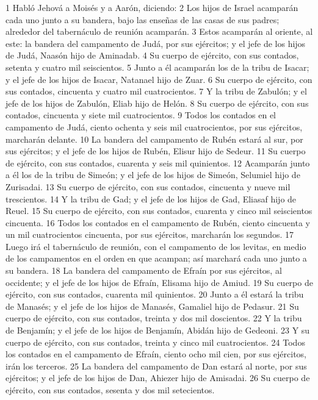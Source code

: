 1 Habló Jehová a Moisés y a Aarón, diciendo:
2 Los hijos de Israel acamparán cada uno junto a su bandera, bajo las enseñas de las casas de sus padres; alrededor del tabernáculo de reunión acamparán.
3 Estos acamparán al oriente, al este: la bandera del campamento de Judá, por sus ejércitos; y el jefe de los hijos de Judá, Naasón hijo de Aminadab.
4 Su cuerpo de ejército, con sus contados, setenta y cuatro mil seiscientos.
5 Junto a él acamparán los de la tribu de Isacar; y el jefe de los hijos de Isacar, Natanael hijo de Zuar.
6 Su cuerpo de ejército, con sus contados, cincuenta y cuatro mil cuatrocientos.
7 Y la tribu de Zabulón; y el jefe de los hijos de Zabulón, Eliab hijo de Helón. 
8 Su cuerpo de ejército, con sus contados, cincuenta y siete mil cuatrocientos.
9 Todos los contados en el campamento de Judá, ciento ochenta y seis mil cuatrocientos, por sus ejércitos, marcharán delante.
10 La bandera del campamento de Rubén estará al sur, por sus ejércitos; y el jefe de los hijos de Rubén, Elisur hijo de Sedeur.
11 Su cuerpo de ejército, con sus contados, cuarenta y seis mil quinientos.
12 Acamparán junto a él los de la tribu de Simeón; y el jefe de los hijos de Simeón, Selumiel hijo de Zurisadai.
13 Su cuerpo de ejército, con sus contados, cincuenta y nueve mil trescientos.
14 Y la tribu de Gad; y el jefe de los hijos de Gad, Eliasaf hijo de Reuel.
15 Su cuerpo de ejército, con sus contados, cuarenta y cinco mil seiscientos cincuenta.
16 Todos los contados en el campamento de Rubén, ciento cincuenta y un mil cuatrocientos cincuenta, por sus ejércitos, marcharán los segundos.
17 Luego irá el tabernáculo de reunión, con el campamento de los levitas, en medio de los campamentos en el orden en que acampan; así marchará cada uno junto a su bandera.
18 La bandera del campamento de Efraín por sus ejércitos, al occidente; y el jefe de los hijos de Efraín, Elisama hijo de Amiud.
19 Su cuerpo de ejército, con sus contados, cuarenta mil quinientos.
20 Junto a él estará la tribu de Manasés; y el jefe de los hijos de Manasés, Gamaliel hijo de Pedasur.
21 Su cuerpo de ejército, con sus contados, treinta y dos mil doscientos.
22 Y la tribu de Benjamín; y el jefe de los hijos de Benjamín, Abidán hijo de Gedeoni.
23 Y su cuerpo de ejército, con sus contados, treinta y cinco mil cuatrocientos.
24 Todos los contados en el campamento de Efraín, ciento ocho mil cien, por sus ejércitos, irán los terceros.
25 La bandera del campamento de Dan estará al norte, por sus ejércitos; y el jefe de los hijos de Dan, Ahiezer hijo de Amisadai.
26 Su cuerpo de ejército, con sus contados, sesenta y dos mil setecientos.
